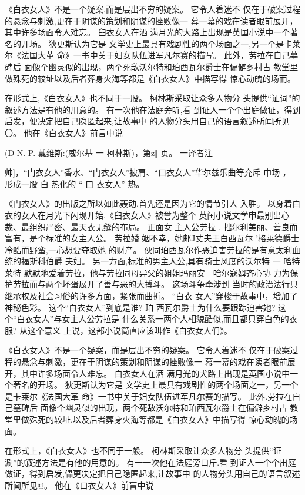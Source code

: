 \documentclass[a4paper]{article}
\begin{document}
《白衣女人》不是一个疑案,而是层出不穷的疑案。 它令人着迷不
仅在于破案过程的悬念与刺激,更在于阴谋的策划和阴谋的挫败像一
幕一幕的戏在读者眼前展开，其中许多场面令人难忘。 臼衣女人在洒
满月光的大路上出现是英国小说中一个著名的开场。 狄更斯认为它是
文学史上最具有戏剧性的两个场面之一,另一个是卡莱尔《法国大革
命》一书中关于妇女队伍进军凡尔赛的描写。 此外，劳拉在自己墓碑后
面像个幽灵似的出现，两个死敌沃尔特和珀西瓦尔爵士在偏僻乡村古
教堂里做殊死的较址以及后者葬身火海等都是《白衣女人》中描写得
惊心动魄的场而。

在形式上,《白衣女人》也不同于一股。 柯林斯采取让众多人物分
头提供“证词”的叙述方法是有他的用意的。 有一次他在法庭旁听,看
到证人一个个出庭做证，得到启发，便决定把自己隐匿起来,让故事中
的人物分头用自己的语言叙述所闻所见〇。 他在《白衣女人》前言中说

(D N. P. 戴维斯:(威尔基 一 柯林斯)，第z‖ 页。 一译者注

帅]，“门衣女人”香水、“门衣女人”披肩、“口衣女人”华尔兹乐曲等充斥
巾场 ， 形成一股 白 热化的 “ 口 衣女人” 热。

《门衣女人》的出版之所以如此轰动,首先还是因为它的情节引人
入胜。 以身着白衣的女人在月光下闪现开始,《臼衣女人》被誉为整个
英闰小说文学申最别出心裁、最组织严密、最天衣无缝的布局。 正面女
主人公劳拉 . 拙尔利美丽、善良而富有，是个标准的女主人公。 劳拉婚
姻不幸，她邮J丈夫王白西瓦尔 '格莱德爵士冷酷而野蛮,一心想要夺取她
的财产。 伙同珀西瓦尔作恶迫害劳拉的是有意太利血统的福斯科伯爵
夫妇。 另一方面,标准的男主人公,具有骑士风度的沃尔特 一 哈特莱特
默默地爱着劳拉，他与劳拉同母异父的姐姐玛丽安 - 哈尔寇姆齐心协
力为保护劳拉而与两个坏蛋展开了善与恶的大搏斗。 这场斗争牵涉到
当时的政治法行只继承权及社会习俗的许多方面，紧张而曲折。 “白衣
女人”穿梭于故事中，增加了神秘色彩。 这个“白衣女人”到底是谁? 珀
西瓦尔爵士为什么要跟踪迫害她? 这个“白衣女人”与女主人公劳拉是
什么关系一两个人相貌酷似,而且都只穿白色的衣服? 从这个意义
上说，这部小说简直应该叫作《白衣女人们》。

《白衣女人》不是一个疑案，而是层出不穷的疑案。 它令人着迷不
仅在于破案过程的悬念与刺激，更在于阴谋的策划和阴谋的挫败像一
幕一幕的戏在读者眼前展开，其中许多场面令人难忘。 白衣女人在洒
满月光的犬路上出现是英国小说中一个著名的开场。 狄更斯认为它是
文学史上最具有戏剧性的两个场面之一，另一个是卡莱尔《法国大革
命》一书中关于妇女队伍进军凡尔赛的描写。 此外.劳拉在自己墓碑后
面像个幽灵似的出现，两个死敌沃尔特和珀西瓦尔爵士在偏僻乡村古
教堂里做殊死的较址.以及后者葬身火海等都是《白衣女人》中描写得
惊心动魄的场面。

在形式上，《白衣女人》也不同于一般。 柯林斯采取让众多人物分
头提供“证涮”的叙述方法是有他的用意的。 有一一次他在法庭旁口斤.看
到证人一个个出庭做证，得到启发,儡更决定把日己隐匿起来,让故事中
的人物分头用自己的语言叙述所闻所见@。 他在《口衣女人》前盲中说
\end{document}
